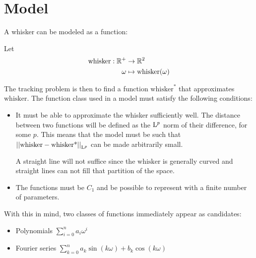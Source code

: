 \section{Model}


A whisker can be modeled as a function:



\begin{definition}
    Let 
    \begin{equation}
    \begin{split}
        \text{whisker} : \mathbb{R}^+ &\rightarrow \mathbb{R}^2 \\
                  \omega&\mapsto \text{whisker}(\omega)
    \end{split}
    \end{equation}
\end{definition}

The tracking problem is then to find a function $\text{whisker}^*$
that approximates $\text{whisker}$. The function class used in a
model must satisfy the following conditions:

\begin{itemize}
\item It must be able to approximate the whisker sufficiently
  well. The distance between two functions will be defined as the
  $\mathrm{L}^{p}$ norm of their difference, for some $p$. This means that the
  model must be such that $\left\vert\left\vert\text{whisker} - \text{whisker*}\right\vert\right\vert_{\mathrm{L}^{p}}$
  can be made arbitrarily small.

  \begin{example}
    A straight line will not suffice since the $\text{whisker}$ is
    generally curved and straight lines can not fill that partition of
    the space.
  \end{example}
  
\item The functions must be $C_1$ and be possible to represent with a
  finite number of parameters.
\end{itemize}

With this in mind, two classes of functions immediately appear as
candidates:
\begin{itemize}
\item Polynomials $\sum_{i=0}^{n} a_i\omega^i$
\item Fourier series $\sum_{k=0}^{n} a_k\sin(k\omega) +
  b_k\cos(k\omega)$
\end{itemize}

